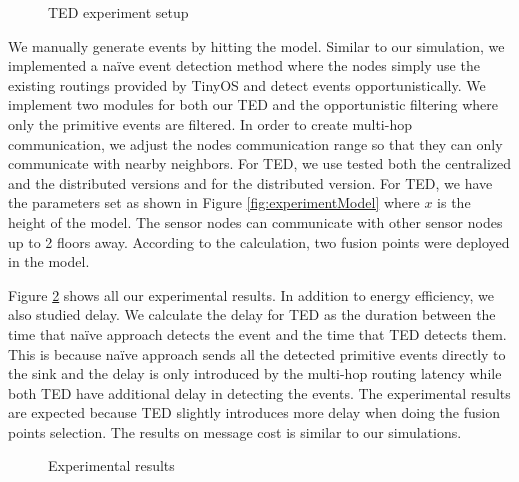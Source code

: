 \begin{figure}
\centering
{}
\caption{TED experiment setup}
\label{fig:experimentSetup}
\end{figure}

We manually generate events by hitting the model. Similar to our simulation, we implemented a na\"{i}ve event detection method where the nodes simply use the existing routings provided by TinyOS \cite{nesc} and detect events opportunistically. We implement two modules for both our TED and the opportunistic filtering where only the primitive events are filtered. In order to create multi-hop communication, we adjust the nodes communication range so that they can only communicate with nearby neighbors. For TED, we use tested both the centralized and the distributed versions and for the distributed version. For TED, we have the parameters set as shown in Figure \ref{fig:experimentModel} where \(x\) is the height of the model. The sensor nodes can communicate with other sensor nodes up to 2 floors away. According to the calculation, two fusion points were deployed in the model.

Figure \ref{fig:exp-all} shows all our experimental results. In addition to energy efficiency, we also studied delay. We calculate the delay for TED as the duration between the time that na\"{i}ve approach detects the event and the time that TED detects them. This is because na\"{i}ve approach sends all the detected primitive events directly to the sink and the delay is only introduced by the multi-hop routing latency while both TED have additional delay in detecting the events. The experimental results are expected because TED slightly introduces more delay when doing the fusion points selection. The results on message cost is similar to our simulations.

\begin{figure}
\centering
{}
\caption{Experimental results}
\label{fig:exp-all}
\end{figure}
